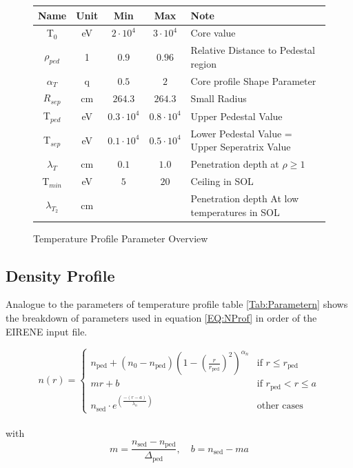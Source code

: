 		\begin{figure}
			\caption{Temperature Profile Parameter Overview}
			\begin{tabular}[width=.8\textwidth]{c|c|c|c|l}
				Name & Unit & Min & Max & Note \\
				\hline
				T$_0$ & eV & $2 \cdot 10^4$ &  $3 \cdot 10^4$ & Core value \\
				$\rho_{ped}$ & 1 & $0.9$ &  $0.96$ & Relative Distance to Pedestal region \\
				$\alpha_{T}$ & q & $0.5$ &  $2$ & Core profile Shape Parameter \\
				$R_{sep}$ & cm & $264.3$ &  $264.3$ & Small Radius \\
				T$_{ped}$ & eV & $0.3 \cdot 10^4$ &  $0.8 \cdot 10^4$ & Upper Pedestal Value \\
				T$_{sep}$ & eV & $0.1 \cdot 10^4$ &  $0.5 \cdot 10^4$ & Lower Pedestal Value = Upper Seperatrix Value \\
				$\lambda_T$ & cm & $0.1$ &  $1.0$ & Penetration depth at $\rho \ge 1$\\
				T$_{min}$ & eV & $5$ &  $20$ & Ceiling in SOL\\
				$\lambda_{T_2}$ & cm & $ $ & $ $ & Penetration depth At low temperatures in SOL\\
			\end{tabular}
			\label{Tab:ParameterT}
		\end{figure}
		
		\subsection{Density Profile}
		Analogue to the parameters of temperature profile table \ref{Tab:Parametern} shows the breakdown of parameters used in equation \ref{EQ:NProf} in order of the EIRENE input file.
		
		\begin{equation}
			n(r) =
			\begin{cases}
				n_{\textrm{ped}} + (n_0 - n_{\textrm{ped}}) \left(1 - \left(\frac{r}{r_{\textrm{ped}}}\right)^2 
				\right)^{\alpha_n} & \textrm{if $r \le r_{\textrm{ped}}$}\\
				mr + b & \textrm{if $r_{\textrm{ped}} < r \le a$} \\
				n_{\textrm{sed}} \cdot e^{\left(\frac{-(r-a)}{\lambda_n}\right)} & \textrm{other cases}
			\end{cases}
			\label{EQ:NProf}
		\end{equation}
		~\\
		with\\
		\begin{equation*}
			m = \frac{n_{\textrm{sed}} - n_{\textrm{ped}}}{\Delta_{\textrm{ped}}}, \quad b = n_{\textrm{sed}} - ma
		\end{equation*}
		
